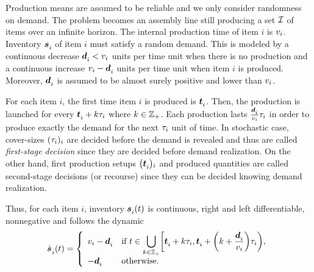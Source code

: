 Production means are assumed to be reliable and we only consider randomness on demand.
The problem becomes an assembly line still producing a set $\mathcal{I}$ of items over an infinite horizon.
The internal production time of item $i$ is $v_i$.
Inventory $\va\inventory_i$ of item $i$ must satisfy a random demand.
This is modeled by a continuous decrease $\va\demand_i<\rate_i$ units per time unit when there is no production and a continuous increase $\rate_i-\va\demand_i$ units per time unit when item $i$ is produced.
Moreover, $\va\demand_i$ is assumed to be almost surely positive and lower than $v_i$.


For each item $i$, the first time item $i$ is produced is $\va t_i$.
Then, the production is launched for every $\va t_i+k\cover_i$ where $k\in\mathbb{Z}_+$.
Each production lasts $\frac{\va\demand_i}{\rate_i}\cover_i$ in order to produce exactly the demand for the next $\tau_i$ unit of time.
In stochastic case, cover-sizes $\bracket{\cover_i}_i$ are decided before the demand is revealed and thus are called \emph{first-stage decision} since they are decided before demand realization.
On the other hand, first production setups $\bracket{\va t_i}_i$ and produced quantities are called second-stage decisions (or recourse) since they can be decided knowing demand realization.




Thus, for each item $i$, inventory $\va\inventory_i\bracket{t}$ is continuous, right and left differentiable, nonnegative and follows the dynamic
\begin{equation}\label{eq:lot-size:single-line:stochastic:motivations:dynamic}
  \dot{\va\inventory}_i\bracket{t} =
  \left\{
  \begin{array}{ll}
  \rate_i-\va\demand_i
  & \ds\mbox{if}\ t\in\bigcup_{k\in\ZZ_+} \left[\va t_i+k\cover_i,\va t_i+\bracket{k+\frac{\va\demand_i}{\rate_i}}\cover_i\right),
  \\
  -\va\demand_i
  & \mbox{otherwise}.
  \end{array}
  \right.
\end{equation}


